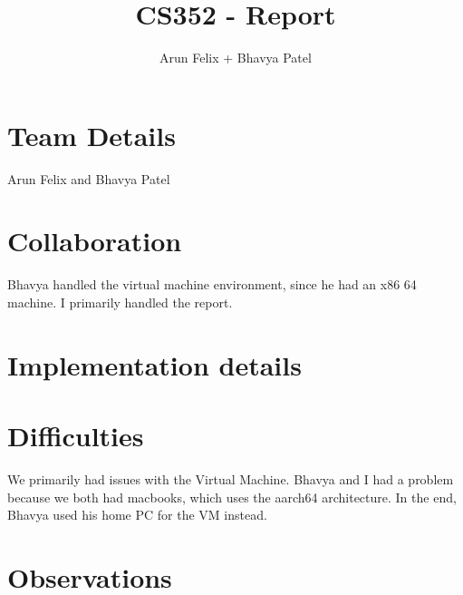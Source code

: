 \documentclass{article}
\title{CS352 - Report}
\author{Arun Felix + Bhavya Patel}
\begin{document}
\maketitle
\section{Team Details}

Arun Felix and Bhavya Patel

\section{Collaboration}

Bhavya handled the virtual machine environment, since he had an x86 64 machine. I primarily handled the report.

\section{Implementation details}

\section{Difficulties}

We primarily had issues with the Virtual Machine. Bhavya and I had a problem because we both had macbooks, which uses the aarch64 architecture. In the end, Bhavya used his home PC for the VM instead. 


\section{Observations}
\end{document}
